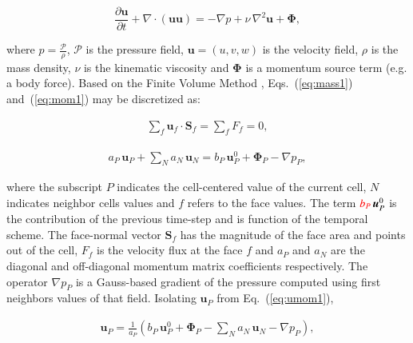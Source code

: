 \documentclass[final,3p,times,10pt,onecolumn]{myElsarticle}
\numberwithin{equation}{section}
\begin{document}
\begin{equation}
\displaystyle \frac{\partial \boldsymbol{u}}{\partial t} + \nabla \cdotp (\boldsymbol{u} \boldsymbol{u}) = -\nabla p + \nu\, \nabla^2 \boldsymbol{u} + \boldsymbol{\Phi},
\label{eq:mom1}
\end{equation}

\noindent where $\displaystyle p = \frac{\mathcal{P}}{\rho}$, $\mathcal{P}$ is the pressure field, $\boldsymbol{u} = (u,v,w)$ is the velocity field, {\color{red}$\rho$ is the mass density, }$\nu$ is the kinematic viscosity and $\mathbf{\Phi}$ is a momentum source term (e.g. a body force).
Based on the Finite Volume Method \cite{jasak}, Eqs.~(\ref{eq:mass1}) and~(\ref{eq:mom1}) may be discretized as:

\begin{equation}
\begin{split}
\sum_{f} \boldsymbol{u}_{f} \cdotp \textbf{S}_{f} = \sum_{f} F_f = 0, 
\end{split}
\label{eq:mass2} 
\end{equation}

\begin{equation}
\begin{split}
a_P\,\boldsymbol{u}_P + \sum_{N} a_{N}\,\boldsymbol{u}_{N} = b_P\, \boldsymbol{u}^0_P + \boldsymbol{\Phi}_P - \nabla p_P,
\label{eq:umom1}
\end{split}
\end{equation}

\noindent where the subscript $P$ indicates the cell-centered value of the current cell, $N$ indicates neighbor cells values and $f$ refers to the face values. The term ${\color{red}b_P}\, \boldsymbol{u}^0_P$ is the contribution of the previous time-step and is function of the temporal scheme. {\color{red} The face-normal vector $\textbf{S}_{f}$ has the magnitude of the face area and points out of the cell}, $F_f$ is the {\color{red} velocity} flux at the face $f$ and $a_P$ and $a_{N}$ are the diagonal and off-diagonal momentum matrix coefficients respectively. The operator $\nabla p_P$ is a Gauss-based gradient of the pressure computed using first neighbors values of that field. Isolating $\boldsymbol{u}_P$ from Eq.~(\ref{eq:umom1}),

\begin{equation}
\begin{split}
\boldsymbol{u}_P = \frac{1}{a_P}\left(b_P\, \boldsymbol{u}^0_P + \boldsymbol{\Phi}_P - \sum_{N} a_{N}\, \boldsymbol{u}_{N} - \nabla p_P\right),
\label{eq:uP}
\end{split}
\end{equation}
\end{document}
